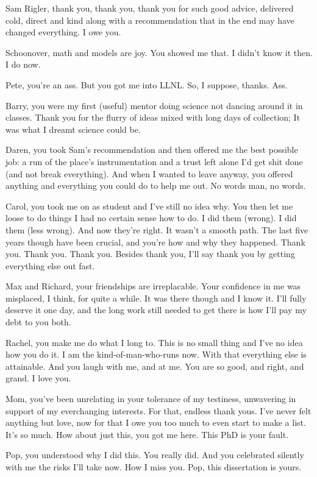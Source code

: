 \begin{acknowledgements}

Sam Rigler, thank you, thank you, thank you for such good advice, delivered cold, direct and kind along with a recommendation that in the end may have changed everything.  I owe you.

Schoonover, math and models are joy.  You showed me that.  I didn't know it then.  I do now.

Pete, you're an ass.  But you got me into LLNL.  So, I suppose, thanks.  Ass.

Barry, you were my first (useful) mentor doing science not dancing around it in classes.  Thank you for the flurry of ideas mixed with long days of collection; It was what I dreamt science could be.

Daren, you took Sam's recommendation and then offered me the best possible job: a run of the place's instrumentation and a trust left alone I'd get shit done (and not break everything).  And when I wanted to leave anyway, you offered anything and everything you could do to help me out.  No words man, no words.

Carol, you took me on as student and I've still no idea why. You then let me loose to do things I had no certain sense how to do. I did them (wrong). I did them (less wrong). And now they're right. It wasn't a smooth path. The last five years though have been crucial, and you're how and why they happened. Thank you. Thank you. Thank you. Besides thank you, I'll say thank you by getting everything else out fast.

Max and Richard, your friendships are irreplacable.  Your confidence in me was misplaced, I think, for quite a while.  It was there though and I know it.  I'll fully deserve it one day, and the long work still needed to get there is how I'll pay my debt to you both.

Rachel, you make me do what I long to.  This is no small thing and I've no idea how you do it.  I am the kind-of-man-who-runs now.  With that everything else is attainable.  And you laugh with me, and at me.  You are so good, and right, and   grand.  I love you.

Mom, you've been unrelating in your tolerance of my testiness, unwavering in support of my everchanging interests.  For that, endless thank yous.  I've never felt anything but love, now for that I owe you too much to even start to make a list.  It's so much.  How about just this, you got me here.  This PhD is your fault.

Pop, you understood why I did this.  You really did. And you celebrated silently with me the risks I'll take now.  How I miss you.  Pop, this dissertation is yours.

\end{acknowledgements}